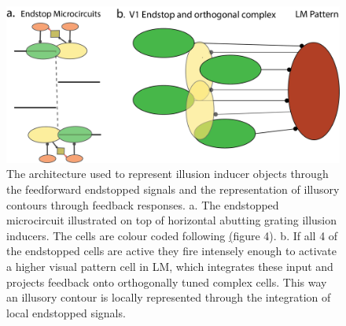\documentclass[12pt]{article}
\begin{document}
\begin{figure}[H]
  \centering
  \includegraphics[width=1 \textwidth]{adjusted_figures/illusory_filling.png}
  \caption{The architecture used to represent illusion inducer objects through the feedforward endstopped signals and the representation of illusory contours through feedback responses. a. The endstopped microcircuit illustrated on top of horizontal abutting grating illusion inducers. The cells are colour coded following \hyperref[fig:LIF_Overview](figure 4). b. If all 4 of the endstopped cells are active they fire intensely enough to activate a higher visual pattern cell in LM, which integrates these input and projects feedback onto orthogonally tuned complex cells. This way an illusory contour is locally represented through the integration of local endstopped signals.}
  \label{fig:illusory_filling}
\end{figure}
\end{document}
